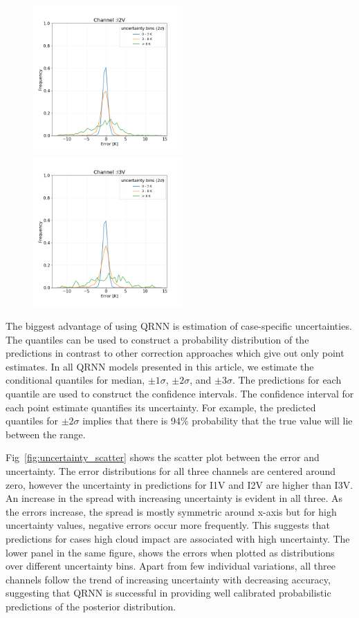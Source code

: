 \documentclass[amt, manuscript]{copernicus}
\begin{document}
\begin{figure}[t]
	\includegraphics[height=57mm]{Figures/Frequency_uncertainty_bins_I2V_single.png}
	\includegraphics[height=57mm]{Figures/Frequency_uncertainty_bins_I3V_single.png}
	\\	
	\caption{}
	\label{fig:error_distributions}	
\end{figure}
The biggest advantage of using QRNN is estimation of case-specific uncertainties. The quantiles can be used to construct a probability distribution of the
predictions in contrast to other correction approaches which give out only point estimates. In all QRNN models presented in this article, we estimate the conditional
quantiles for median, $\pm 1\sigma$, $\pm 2\sigma$, and $\pm 3\sigma$. The
predictions for each quantile are used to construct the confidence intervals.
The confidence interval for each point estimate quantifies its uncertainty. For example, the predicted quantiles for $\pm 2 \sigma$ implies that there is  94\% probability that the true value will lie between the range.

Fig~\ref{fig:uncertainty_scatter} shows the scatter plot between the error and uncertainty. The error distributions for all three channels are centered around zero, however the uncertainty in predictions for I1V and I2V are higher than I3V. An increase in the spread with increasing uncertainty is evident in all three. As the errors increase, the spread is mostly symmetric around x-axis but for high uncertainty values, negative errors occur more frequently. This suggests that predictions for cases high cloud impact are associated with high uncertainty. The lower panel in the same figure, shows the errors when plotted as distributions over different uncertainty bins. Apart from few individual variations, all three channels follow the trend of increasing uncertainty with decreasing accuracy, suggesting that QRNN is successful in providing well calibrated probabilistic predictions of the posterior distribution. 
\end{document}
